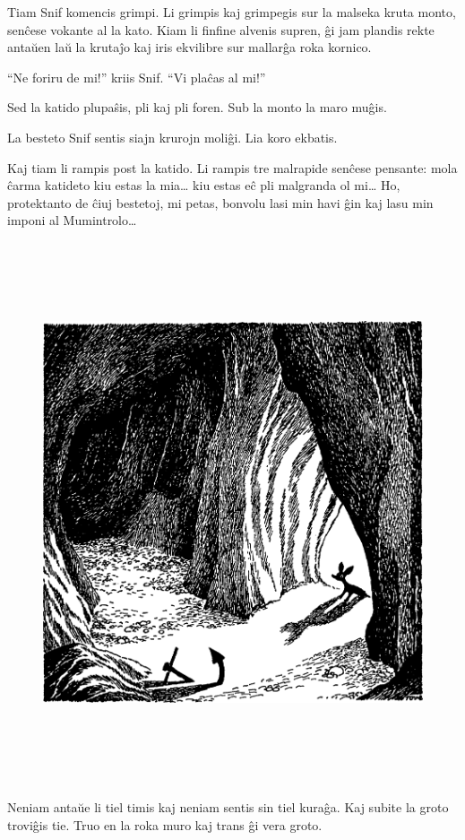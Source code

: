 Tiam Snif komencis grimpi. Li grimpis kaj grimpegis sur la malseka kruta monto, senĉese vokante al la kato. Kiam li finfine alvenis supren, ĝi jam plandis rekte antaŭen laŭ la krutaĵo kaj iris ekvilibre sur mallarĝa roka kornico.

``Ne foriru de mi!'' kriis Snif. ``Vi plaĉas al mi!''

Sed la katido plupaŝis, pli kaj pli foren. Sub la monto la maro muĝis.

La besteto Snif sentis siajn krurojn moliĝi. Lia koro ekbatis.

Kaj tiam li rampis post la katido. Li rampis tre malrapide senĉese pensante: mola ĉarma katideto kiu estas la mia{\ldots} kiu estas eĉ pli malgranda ol mi{\ldots} Ho, protektanto de ĉiuj bestetoj, mi petas, bonvolu lasi min havi ĝin kaj lasu min imponi al Mumintrolo{\ldots}

\begin{figure}[htbp]
\centering
\includegraphics[width=450pt,height=452pt]{1-7.png}
\caption{}
\label{1-7}
\end{figure}

Neniam antaŭe li tiel timis kaj neniam sentis sin tiel kuraĝa. Kaj subite la groto troviĝis tie. Truo en la roka muro kaj trans ĝi vera groto.

